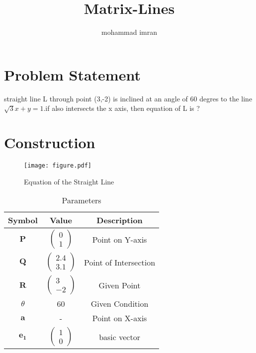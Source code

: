 \documentclass[journal,12pt,twocolumn]{article}
\newcommand{\myvec}[1]{\ensuremath{\begin{pmatrix}#1\end{pmatrix}}}
\let\vec\mathbf
\begin{document}
\title
{Matrix-Lines}
\author{mohammad imran}

\maketitle
\tableofcontents
\bigskip
\section{Problem Statement}
straight line L through point (3,-2) is inclined at an angle of 60 degres to the line  $\surd3x+y=1$.if also intersects the x axis, then equation of L is ?\\
\section{Construction}
\begin{figure}[h]
    \centering
\texttt{[image: figure.pdf]}
    \caption{Equation of the Straight Line}
    \label{fig:my_label}
\end{figure}
\vspace{2cm}
\begin{table}[h]
    \centering
    \begin{tabular}{|c|c|c|}
       \hline
       \textbf{Symbol}&\textbf{Value}&\textbf{Description}  \\
       \hline
	    $\vec{P}$ & $\myvec{
		    0\\
		    1}$
	    & Point on Y-axis\\
        \hline
	    $\vec{Q}$ & $\myvec{2.4\\3.1}$
 & Point of Intersection\\
        \hline
	    $\vec{R}$ & $\myvec{
  3\\
  -2}$
 & Given Point \\
        \hline
        $\theta $ & 60  & Given Condition\\
        \hline
         $\vec{a}$ & -
	    & Point on X-axis \\
	    \hline
	    $\vec{e_1}$ & $\myvec{1 \\ 0}$
	    & basic vector\\
	    \hline
    \end{tabular}
    \caption{Parameters}
    \label{tab:my_label}
\end{table}
\end{document}
